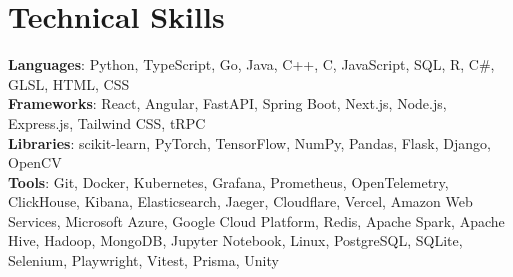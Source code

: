 \documentclass[letterpaper,11pt]{article}
\begin{document}
\section{Technical Skills}
 \begin{itemize}[leftmargin=0.15in, label={}]
    \small{\item{
     \textbf{Languages}{: Python, TypeScript, Go, Java, C++, C, JavaScript, SQL, R, C\#, GLSL, HTML, CSS} \\
     \textbf{Frameworks}{: React, Angular, FastAPI, Spring Boot, Next.js, Node.js, Express.js, Tailwind CSS, tRPC} \\
     \textbf{Libraries}{: scikit-learn, PyTorch, TensorFlow, NumPy, Pandas, Flask, Django, OpenCV} \\
     \textbf{Tools}{: Git, Docker, Kubernetes, Grafana, Prometheus, OpenTelemetry, ClickHouse, Kibana, Elasticsearch, Jaeger, Cloudflare, Vercel, Amazon Web Services, Microsoft Azure, Google Cloud Platform, Redis, Apache Spark, Apache Hive, Hadoop, MongoDB, Jupyter Notebook, Linux, PostgreSQL, SQLite, Selenium, Playwright, Vitest, Prisma, Unity} \\
    }}
 \end{itemize}

\end{document}
